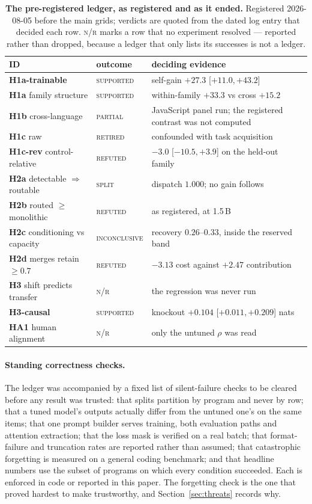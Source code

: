 \begin{table}[t]
\centering\small\setlength{\tabcolsep}{4pt}
\caption{\textbf{The pre-registered ledger, as registered and as it ended.} Registered
2026-08-05 before the main grids; verdicts are quoted from the dated log entry that decided each
row. \textsc{n/r} marks a row that no experiment resolved --- reported rather than dropped, because
a ledger that only lists its successes is not a ledger.}
\label{tab:prereg}
\begin{tabular}{@{}llp{3.1cm}@{}}
\toprule
ID & outcome & deciding evidence \\
\midrule
\textbf{H1a-trainable} & \textsc{supported} & self-gain $+27.3$ [$+11.0, +43.2$] \\
\textbf{H1a} family structure & \textsc{supported} & within-family $+33.3$ vs cross $+15.2$ \\
\textbf{H1b} cross-language & \textsc{partial} & JavaScript panel run; the registered contrast was not computed \\
\textbf{H1c} raw & \textsc{retired} & confounded with task acquisition \\
\textbf{H1c-rev} control-relative & \textsc{refuted} & $-3.0$ [$-10.5, +3.9$] on the held-out family \\
\textbf{H2a} detectable $\Rightarrow$ routable & \textsc{split} & dispatch $1.000$; no gain follows \\
\textbf{H2b} routed $\ge$ monolithic & \textsc{refuted} & as registered, at 1.5\,B \\
\textbf{H2c} conditioning vs capacity & \textsc{inconclusive} & recovery $0.26$--$0.33$, inside the reserved band \\
\textbf{H2d} merges retain $\ge 0.7$ & \textsc{refuted} & $-3.13$ cost against $+2.47$ contribution \\
\textbf{H3} shift predicts transfer & \textsc{n/r} & the regression was never run \\
\textbf{H3-causal} & \textsc{supported} & knockout $+0.104$ [$+0.011, +0.209$] nats \\
\textbf{HA1} human alignment & \textsc{n/r} & only the untuned $\rho$ was read \\
\bottomrule
\end{tabular}
\end{table}

\paragraph{Standing correctness checks.} The ledger was accompanied by a fixed list of
silent-failure checks to be cleared before any result was trusted: that splits partition by
program and never by row; that a tuned model's outputs actually differ from the untuned one's on
the same items; that one prompt builder serves training, both evaluation paths and attention
extraction; that the loss mask is verified on a real batch; that format-failure and truncation
rates are reported rather than assumed; that catastrophic forgetting is measured on a general
coding benchmark; and that headline numbers use the subset of programs on which every condition
succeeded. Each is enforced in code or reported in this paper. The forgetting check is the one that
proved hardest to make trustworthy, and Section~\ref{sec:threats} records why.
